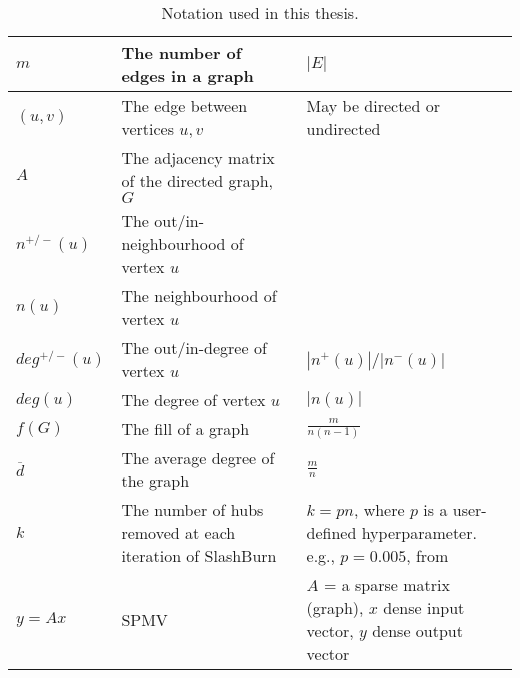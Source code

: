 \begin{table}
\begin{adjustwidth}{-0.75in}{-0.75in}
\begin{tabular}{ |p{2cm}|p{6cm}|p{5cm}|  }
            $m$              & The number of edges in a graph                                                                                      & $|E|$                   \\
            \hline

            $(u, v)$         & The edge between vertices $u, v$                                                                                    & May be directed or undirected \\
            \hline

            $A$              & The adjacency matrix of the directed graph, $G$                                                                     &                               \\
            \hline
            $n^{+/-}(u)$       & The out/in-neighbourhood of vertex $u$                                                                                 &                               \\
            \hline
            $n(u)$       & The neighbourhood of vertex $u$                                                                                  &                               \\
            \hline
            $deg^{+/-}(u)$     & The out/in-degree of vertex $u$ & $|n^{+}(u)|$/$|n^{-}(u)| $           \\
            \hline
            $deg(u)$     & The degree of vertex $u$   & $|n(u)|$            \\
            \hline
            $f(G)$     & The fill of a graph & $\frac{m}{n(n-1)}$            \\
            \hline
            $\overline{d}$ & The average degree of the graph & $\frac{m}{n}$            \\
            \hline
            $k$ & The number of hubs removed at each iteration of SlashBurn & $k = pn$, 
            where $p$ is a user-defined hyperparameter. e.g., $p = 0.005$, from \cite{slashburn}          \\
            \hline
            $y = Ax$ & \ac{SPMV} &$A$ = a sparse matrix (graph), 
            $x$ dense input vector,
            $y$ dense output vector             \\
            \hline

            
        \end{tabular}
        \caption{\label{tab:notation1}Notation used in this thesis.}
    \end{adjustwidth}
\end{table}


